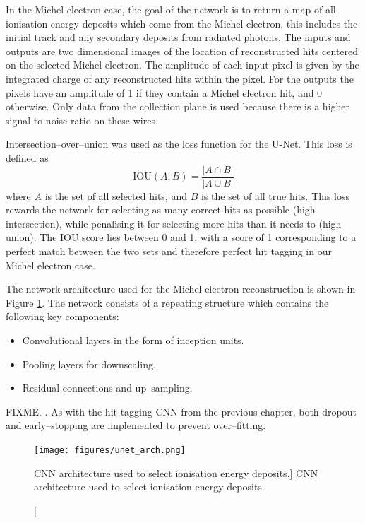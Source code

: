 
In the Michel electron case, the goal of the network is to return a map of all
ionisation energy deposits which come from the Michel electron, this includes
the initial track and any secondary deposits from radiated photons. The inputs
and outputs are two dimensional images of the location of reconstructed hits
centered on the selected Michel electron. The amplitude of each input pixel is 
given by the integrated charge of any reconstructed hits within the pixel. For
the outputs the pixels have an amplitude of 1 if they contain a Michel electron
hit, and 0 otherwise. Only data from the collection plane is used because there 
is a higher signal to noise ratio on these wires. 

Intersection--over--union was used as the loss function for the U-Net. This loss
is defined as 
\begin{equation}
	\mbox{IOU}(A, B) = \frac{|A \cap B|}{|A \cup B|}
\end{equation}
where $A$ is the set of all selected hits, and $B$ is the set of all true hits.
This loss rewards the network for selecting as many correct hits as possible
(high intersection), while penalising it for selecting more hits than it needs
to (high union). The IOU score lies between 0 and 1, with a score of 1
corresponding to a perfect match between the two sets and therefore perfect hit
tagging in our Michel electron case.

The network architecture used for the Michel electron reconstruction is shown in
Figure \ref{fig:unet_arch}. The network consists of a repeating structure which
contains the following key components:
\begin{itemize}
	\item Convolutional layers in the form of inception units.
	\item Pooling layers for downscaling.
	\item Residual connections and up--sampling.
\end{itemize}
FIXME. . As with the hit tagging CNN from the previous chapter, 
both dropout and early--stopping are implemented to prevent over--fitting.
\begin{figure}
	\centering
	\texttt{[image: figures/unet\_arch.png]}
	\caption
	[CNN architecture used to select ionisation energy deposits.]
	{CNN architecture used to select ionisation energy deposits.}
	\label{fig:unet_arch}
\end{figure}

